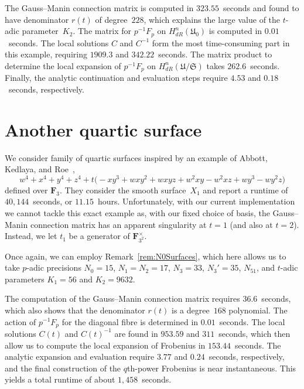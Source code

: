 The Gauss--Manin connection matrix is computed in $323.55$~seconds and found 
to have denominator $r(t)$ of degree~$228$, which explains the large value 
of the $t$-adic parameter~$K_2$.  The matrix for $p^{-1} F_p$ on 
$H_{dR}^{n}(\mathfrak{U}_0)$ is computed in $0.01$~seconds.  The local 
solutions $C$ and $C^{-1}$ form the most time-consuming part in this example, 
requiring $1909.3$ and $342.22$~seconds.  The matrix product to determine the 
local expansion of $p^{-1} F_p$ on $H_{dR}^{n}(\mathfrak{U}/\mathfrak{S})$ 
takes $262.6$~seconds. Finally, the analytic continuation and evaluation steps 
require $4.53$ and $0.18$~seconds, respectively.

\section{Another quartic surface}

We consider family of quartic surfaces inspired by an example of 
Abbott, Kedlaya, and Roe~\citep[Example~4.2.1]{AbbottKedlayaRoe2006}, 
\begin{equation*}
w^4 + x^4 + y^4 + z^4 + t \bigl(
    -x y^3 + w x y^2 + w x y z  + w^2 x y - w^2 x z + w y^3 - w y^2 z \bigr) 
\end{equation*}
defined over $\mathbf{F}_3$.  They consider the smooth surface~$X_1$ 
and report a runtime of $40,144$~seconds, or $11.15$~hours.  Unfortunately, 
with our current implementation we cannot tackle this exact example 
as, with our fixed choice of basis, the Gauss--Manin connection matrix 
has an apparent singularity at $t = 1$ (and also at $t = 2$).  Instead, 
we let $t_1$ be a generator of $\mathbf{F}_{3^2}^{\times}$.

Once again, we can employ Remark~\ref{rem:N0Surfaces}, which here allows 
us to take $p$-adic precisions $N_0 = 15$, $N_1 = N_2 = 17$, $N_3 = 33$, 
$N_3' = 35$, $N_51$, and $t$-adic parameters $K_1 = 56$ and $K_2 = 9632$.

The computation of the Gauss--Manin connection matrix requires $36.6$~seconds, 
which also shows that the denominator $r(t)$ is a degree~$168$ polynomial.
The action of $p^{-1} F_p$ for the diagonal fibre is determined in 
$0.01$~seconds.  The local solutions $C(t)$ and $C(t)^{-1}$ are found in 
$953.59$ and $311$~seconds, which then allow us to compute the local expansion 
of Frobenius in $153.44$~seconds.  The analytic expansion and 
evaluation require $3.77$ and $0.24$~seconds, respectively, and the final 
construction of the $q$th-power Frobenius is near instantaneous. 
This yields a total runtime of about $1,458$~seconds.

